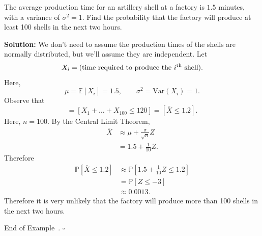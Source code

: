 \documentclass[10pt]{article}
\theoremstyle{definition}
\newtheorem{remark}[theorem]{Remark}
\newtheorem{example}[theorem]{Example}
\renewenvironment{example}
{\begin{oldexample}}
  {\par\smallskip\hfill   End of Example~\theexample. $\square$    \par\end{oldexample}}
\newcommand{\vt}{\vskip 5mm} %
\newcommand{\Fl}{\vt\noindent\textbf} %
\newcommand{\1}[1]{\textbf{1}_{\left[#1\right]}} %
\def\E{\mathbb{E}} %
\def\P{\mathbb{P}} %
\def\Var{\mathrm{Var}} %
\begin{document}
\begin{example}
  The average production time for an artillery shell at a factory is $1.5$
  minutes, with a variance of $\sigma^{2}=1$. Find the probability that the
  factory will produce at least 100 shells in the next two hours.

  \Fl{Solution:} We don't need to assume the production times of the shells
  are normally distributed, but we'll assume they are independent. Let
  \begin{equation*}
    X_{i} = \text{(time required to produce the $i^{\rm th}$ shell)}.
  \end{equation*}
  Here,
  \begin{equation*}
    \mu = \E[X_{i}] = 1.5, \qquad \sigma^{2} = \Var(X_{i}) = 1.
  \end{equation*}
  Observe that
  \begin{equation*}
    [\text{at least 100 shells are produced in two hours}] 
    = [X_{1}+\ldots+X_{100}\leq 120]
    = [\overline{X}\leq 1.2].
  \end{equation*}
  Here, $n=100$. By the Central Limit Theorem,
  \begin{align*}
    \overline{X} 
    &\approx \mu+\frac{\sigma}{\sqrt{n}}Z\\
    &= 1.5 + \frac{1}{10}Z.
  \end{align*}
  Therefore
  \begin{align*}
    \P \left[ \overline{X}\leq 1.2\right]
    &\approx \P \left[ 1.5+ \frac{1}{10}Z \leq 1.2\right]\\ 
    &= \P[Z \leq -3]\\
    &\approx 0.0013.
  \end{align*}
  Therefore it is very unlikely that the factory will produce more than 100
  shells in the next two hours.
\end{example}
\newpage
\end{document}
